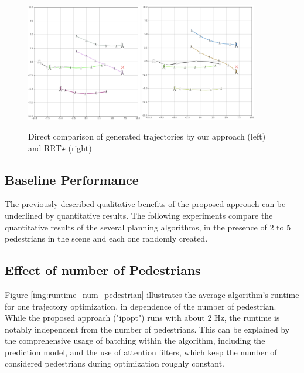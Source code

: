 \begin{figure}[!ht]
\begin{center}
\includegraphics[width=0.45\textwidth]{images/show_case_ipopt.png}
\includegraphics[width=0.45\textwidth]{images/show_case_rrt.png}
\caption{Direct comparison of generated trajectories by our approach (left) and \ac{RRT}$\star$ \cite{Karaman2011} (right)}
\end{center}
\label{img:show_case}
\end{figure}

\subsection{Baseline Performance}
The previously described qualitative benefits of the proposed approach can be underlined by quantitative results. The following experiments compare the quantitative results of the several planning algorithms, in the presence of 2 to 5 pedestrians in the scene and each one randomly created. 

\subsection{Effect of number of Pedestrians}
Figure \ref{img:runtime_num_pedestrian} illustrates the average algorithm's runtime for one trajectory optimization, in dependence of the number of pedestrian. While the proposed approach ("ipopt") runs with about 2 Hz, the runtime is notably independent from the number of pedestrians. This can be explained by the comprehensive usage of batching within the algorithm, including the prediction model, and the use of attention filters, which keep the number of considered pedestrians during optimization roughly constant.

